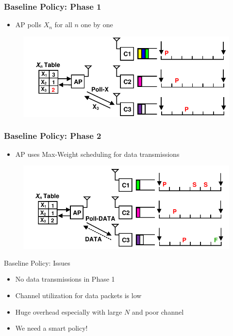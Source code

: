\documentclass{beamer}
\begin{document}
\begin{frame}
\frametitle{Baseline Policy: Phase 1}
\begin{itemize}
\item AP polls $X_n$ for all $n$ one by one
\end{itemize}
\begin{figure}
\centering
\includegraphics[scale=0.8]{animation_03.pdf}
\end{figure}
\end{frame}

\begin{frame}
\frametitle{Baseline Policy: Phase 2}
\begin{itemize}
\item AP uses Max-Weight scheduling for data transmissions
\end{itemize}
\begin{figure}
\centering
\includegraphics[scale=0.8]{animation_06.pdf}
\end{figure}
\end{frame}

\begin{frame}{Baseline Policy: Issues}
  \begin{itemize}
    \item No data transmissions in Phase 1
    \item Channel utilization for data packets is low
    \item Huge overhead especially with large $N$ and poor channel
      \pause
    \item We need a smart policy!
  \end{itemize}
\end{frame}
\end{document}

